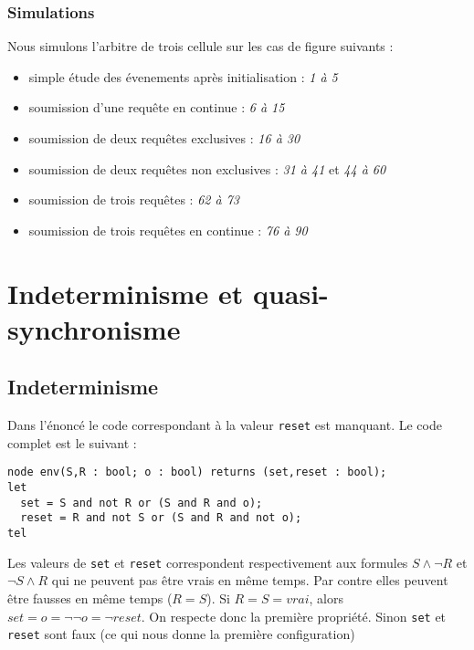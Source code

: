 \documentclass[a4paper]{article}
\begin{document}
\subsubsection{Simulations}
Nous simulons l'arbitre de trois cellule sur les cas de figure suivants : 
\begin{itemize}
\item simple étude des évenements après initialisation : \emph{1 à 5}
\item soumission d'une requête en continue : \emph{6 à 15}
\item soumission de deux requêtes exclusives : \emph{16 à 30}
\item soumission de deux requêtes non exclusives : \emph{31 à 41} et \emph{44 à 60}
\item soumission de trois requêtes : \emph{62 à 73}
\item soumission de trois requêtes en continue : \emph{76 à 90}
\end{itemize}

\vspace{10mm}



\section{Indeterminisme et quasi-synchronisme}

\subsection{Indeterminisme}

Dans l'énoncé le code correspondant à la valeur \texttt{reset} est
manquant. Le code complet est le suivant :

\begin{verbatim}
node env(S,R : bool; o : bool) returns (set,reset : bool);
let
  set = S and not R or (S and R and o);
  reset = R and not S or (S and R and not o);
tel
\end{verbatim}

Les valeurs de \texttt{set} et \texttt{reset} correspondent
respectivement aux formules $S \wedge \neg R$ et $\neg S \wedge R$ qui
ne peuvent pas être vrais en même temps. Par contre elles peuvent être
fausses en même temps ($R = S$). Si $R = S = vrai$, alors $set = o = \neg
\neg o = \neg reset$. On respecte donc la première
propriété. Sinon \texttt{set} et \texttt{reset} sont faux
(ce qui nous donne la première configuration)
\end{document}
